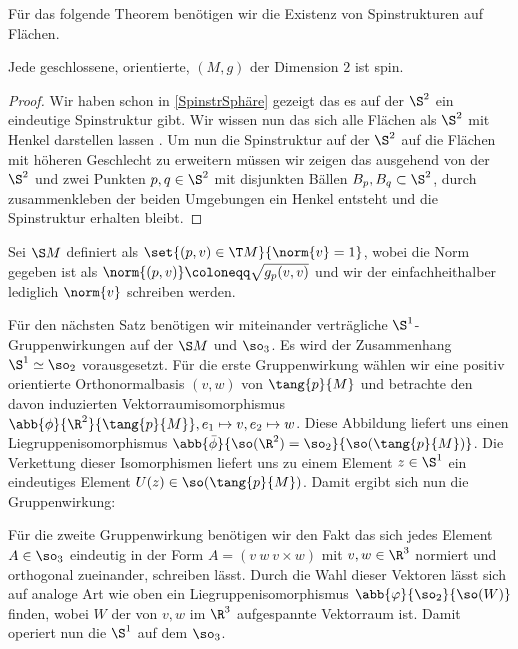 Für das folgende Theorem benötigen wir die Existenz von Spinstrukturen
auf Flächen.
\begin{Satz}
	Jede geschlossene, orientierte, \RMF  $(M,g)$ der Dimension $2$ ist spin.
	\begin{proof}
		Wir haben schon in \cref{SpinstrSphäre} gezeigt das es 
		auf der $ \S^2 $ ein eindeutige Spinstruktur gibt. Wir
		wissen nun das sich alle Flächen als $ \S^2 $ mit Henkel 
		darstellen lassen . Um nun die Spinstruktur auf der $ \S^2 $
		auf die Flächen mit höheren Geschlecht zu erweitern müssen
		wir zeigen das ausgehend von der $ \S^2 $ und zwei Punkten
		$ p,q \in\S^2 $ mit disjunkten Bällen $ B_p,B_q \subset\S^2$,
		durch zusammenkleben der beiden Umgebungen ein Henkel
		entsteht und die Spinstruktur erhalten bleibt.
	\end{proof}
\end{Satz}

Sei $\S M$ definiert als $\set{(p,v) \in \T M}{ \norm{v} = 1}$, wobei
die Norm gegeben ist als $ \norm{(p,v)} \coloneqq \sqrt{g_p(v,v)} $
und wir der einfachheithalber lediglich $ \norm{v} $ schreiben werden.

Für den nächsten Satz benötigen wir miteinander verträgliche $ \S^1 $-Gruppenwirkungen auf der $ \S M $ und $ \so_3 $. Es wird der
Zusammenhang $ \S^1 \simeq \so_2 $ vorausgesetzt. Für die erste
Gruppenwirkung wählen wir eine positiv orientierte Orthonormalbasis
$ (v,w) $ von $ \tang{p}{M} $ und betrachte den davon induzierten
Vektorraumisomorphismus $ \abb{\phi}{\R^2}{\tang{p}{M}},e_1 \mapsto v, e_2\mapsto w $. Diese
Abbildung liefert uns einen Liegruppenisomorphismus $\abb{\bar{\phi}}{\so(\R^2) = \so_2}{\so(\tang{p}{M})} $. Die Verkettung
dieser Isomorphismen liefert uns zu einem Element $ z\in\S^1 $ ein
eindeutiges Element $ U(z)\in \so(\tang{p}{M}) $. Damit ergibt sich
nun die Gruppenwirkung:

Für die zweite Gruppenwirkung benötigen wir den Fakt das sich jedes
Element $ A \in \so_3$  eindeutig in der Form $ A=\left( v~w~v\times w\right) $ mit $ v,w \in \R^3$ normiert und orthogonal zueinander, 
schreiben lässt. Durch die Wahl dieser Vektoren lässt sich auf
analoge Art wie oben ein Liegruppenisomorphismus $ \abb{\varphi}{\so_2}{\so(W)} $ finden, wobei $ W $ der von $ v,w $ 
im $ \R^3 $ aufgespannte Vektorraum ist. Damit operiert nun die
$ \S^1 $ auf dem $ \so_3 $.

